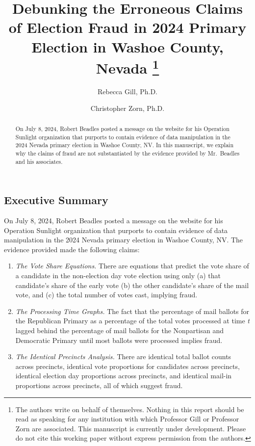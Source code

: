 \documentclass[12pt]{article}
\title{Debunking the Erroneous Claims of Election Fraud in 2024 Primary Election in Washoe County, Nevada%
  \thanks{The authors write on behalf of themselves. Nothing in this report should be read as speaking for any institution with which Professor Gill or Professor Zorn are associated. This manuscript is currently under development. Please do not cite this working paper without express permission from the authors.}}
\author[1]{Rebecca Gill, Ph.D.}
\affil{University of Nevada Las Vegas \thanks{\href{mailto:rebecca.gill@unlv.edu}{\nolinkurl{rebecca.gill@unlv.edu}}}}
\author[2]{Christopher Zorn, Ph.D.}
\affil{Pennsylvania State University \thanks{\href{mailto:zorn@psu.edu}{\nolinkurl{zorn@psu.edu}}}}
\providecommand{\tightlist}{%
  \setlength{\itemsep}{0pt}\setlength{\parskip}{0pt}}
\begin{document}

\setcounter{page}{0}
\maketitle
\begin{abstract}
\noindent On July 8, 2024, Robert Beadles posted a message on the website for his Operation Sunlight organization that purports to contain evidence of data manipulation in the 2024 Nevada primary election in Washoe County, NV. In this manuscript, we explain why the claims of fraud are not substantiated by the evidence provided by Mr.~Beadles and his associates.
\end{abstract}
\thispagestyle{empty}


\clearpage
\doublespacing

\subsection{Executive Summary}\label{executive-summary}

On July 8, 2024, Robert Beadles posted a message on the website for his Operation Sunlight organization that purports to contain evidence of data manipulation in the 2024 Nevada primary election in Washoe County, NV. The evidence provided made the following claims:

\begin{enumerate}
\def\labelenumi{\arabic{enumi}.}
\tightlist
\item
  \emph{The Vote Share Equations.} There are equations that predict the vote share of a candidate in the non-election day vote election using only (a) that candidate's share of the early vote (b) the other candidate's share of the mail vote, and (c) the total number of votes cast, implying fraud.
\item
  \emph{The Processing Time Graphs.} The fact that the percentage of mail ballots for the Republican Primary as a percentage of the total votes processed at time \emph{t} lagged behind the percentage of mail ballots for the Nonpartisan and Democratic Primary until most ballots were processed implies fraud.
\item
  \emph{The Identical Precincts Analysis.} There are identical total ballot counts across precincts, identical vote proportions for candidates across precincts, identical election day proportions across precincts, and identical mail-in proportions across precincts, all of which suggest fraud.
\end{enumerate}
\end{document}
